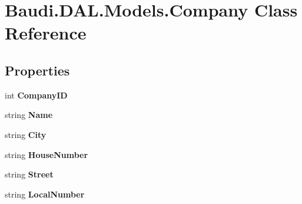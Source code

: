 \hypertarget{class_baudi_1_1_d_a_l_1_1_models_1_1_company}{}\section{Baudi.\+D\+A\+L.\+Models.\+Company Class Reference}
\label{class_baudi_1_1_d_a_l_1_1_models_1_1_company}
\subsection*{Properties}
\begin{DoxyCompactItemize}
\item 
\hypertarget{class_baudi_1_1_d_a_l_1_1_models_1_1_company_a0afdf84aa943ae0ae553134c70797423}{}int {\bfseries Company\+I\+D}\label{class_baudi_1_1_d_a_l_1_1_models_1_1_company_a0afdf84aa943ae0ae553134c70797423}

\item 
\hypertarget{class_baudi_1_1_d_a_l_1_1_models_1_1_company_ab81aa6b01e0319da83bddcc65e74f6c1}{}string {\bfseries Name}\label{class_baudi_1_1_d_a_l_1_1_models_1_1_company_ab81aa6b01e0319da83bddcc65e74f6c1}

\item 
\hypertarget{class_baudi_1_1_d_a_l_1_1_models_1_1_company_aefa6517d29bc5c2e6fda4d4d00617082}{}string {\bfseries City}\label{class_baudi_1_1_d_a_l_1_1_models_1_1_company_aefa6517d29bc5c2e6fda4d4d00617082}

\item 
\hypertarget{class_baudi_1_1_d_a_l_1_1_models_1_1_company_a6db1ba523de077778b78188d48830568}{}string {\bfseries House\+Number}\label{class_baudi_1_1_d_a_l_1_1_models_1_1_company_a6db1ba523de077778b78188d48830568}

\item 
\hypertarget{class_baudi_1_1_d_a_l_1_1_models_1_1_company_ae61d6849bef869697b3cda9e693df275}{}string {\bfseries Street}\label{class_baudi_1_1_d_a_l_1_1_models_1_1_company_ae61d6849bef869697b3cda9e693df275}

\item 
\hypertarget{class_baudi_1_1_d_a_l_1_1_models_1_1_company_a795928b7271c04b4f2db4f1ac8596f10}{}string {\bfseries Local\+Number}\label{class_baudi_1_1_d_a_l_1_1_models_1_1_company_a795928b7271c04b4f2db4f1ac8596f10}


\end{DoxyCompactItemize}
